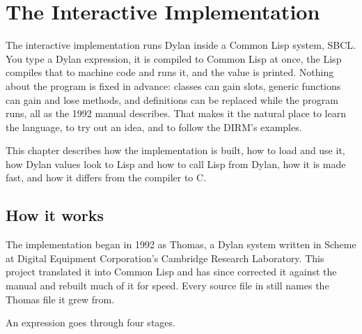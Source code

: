 \chapter{The Interactive Implementation}\label{ch:lisp}

The interactive implementation runs Dylan inside a Common Lisp system,
SBCL. You type a Dylan expression, it is compiled to Common Lisp at once,
the Lisp compiles that to machine code and runs it, and the value is
printed. Nothing about the program is fixed in advance: classes can gain
slots, generic functions can gain and lose methods, and definitions can
be replaced while the program runs, all as the 1992 manual describes.
That makes it the natural place to learn the language, to try out an
idea, and to follow the DIRM's examples.

This chapter describes how the implementation is built, how to load and
use it, how Dylan values look to Lisp and how to call Lisp from Dylan,
how it is made fast, and how it differs from the compiler to C.

\section{How it works}\label{sec:lisp-architecture}

The implementation began in 1992 as Thomas, a Dylan system written in
Scheme at Digital Equipment Corporation's Cambridge Research Laboratory.
This project translated it into Common Lisp and has since corrected it
against the manual and rebuilt much of it for speed. Every source file in
 still names the Thomas file it grew from.

An expression goes through four stages.

